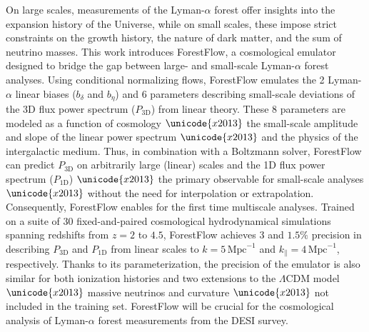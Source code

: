On large scales, measurements of the Lyman-$\alpha$ forest offer insights into the expansion history of the Universe, while on small scales, these impose strict constraints on the growth history, the nature of dark matter, and the sum of neutrino masses. This work introduces ForestFlow, a cosmological emulator designed to bridge the gap between large- and small-scale Lyman-$\alpha$ forest analyses. Using conditional normalizing flows, ForestFlow emulates the 2 Lyman-$\alpha$ linear biases ($b_\delta$ and $b_\eta$) and 6 parameters describing small-scale deviations of the 3D flux power spectrum ($P_\mathrm{3D}$) from linear theory. These 8 parameters are modeled as a function of cosmology $\unicode{x2013}$ the small-scale amplitude and slope of the linear power spectrum $\unicode{x2013}$ and the physics of the intergalactic medium. Thus, in combination with a Boltzmann solver, ForestFlow can predict $P_\mathrm{3D}$ on arbitrarily large (linear) scales and the 1D flux power spectrum ($P_\mathrm{1D}$) $\unicode{x2013}$ the primary observable for small-scale analyses $\unicode{x2013}$ without the need for interpolation or extrapolation. Consequently, ForestFlow enables for the first time multiscale analyses. Trained on a suite of 30 fixed-and-paired cosmological hydrodynamical simulations spanning redshifts from $z=2$ to $4.5$, ForestFlow achieves $3$ and $1.5\%$ precision in describing $P_\mathrm{3D}$ and $P_\mathrm{1D}$ from linear scales to $k=5\,\mathrm{Mpc}^{-1}$ and $k_\parallel=4\,\mathrm{Mpc}^{-1}$, respectively. Thanks to its parameterization, the precision of the emulator is also similar for both ionization histories and two extensions to the $\Lambda$CDM model $\unicode{x2013}$ massive neutrinos and curvature $\unicode{x2013}$ not included in the training set. ForestFlow will be crucial for the cosmological analysis of Lyman-$\alpha$ forest measurements from the DESI survey.